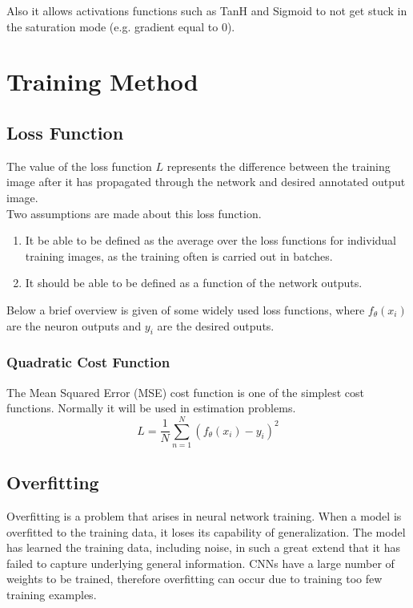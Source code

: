     Also it allows activations functions such as TanH and Sigmoid to not get stuck in the saturation mode (e.g. gradient equal to $0$).

    \section{Training Method}
    \label{training}
    \subsection{Loss Function}
    The value of the loss function $L$ represents the difference between the training image after it has propagated through the network and desired annotated output image.\\ 

    Two assumptions are made about this loss function. 
    \begin{enumerate}
        \item It be able to be defined as the average over the loss functions for individual training images, as the training often is carried out in batches.
        \item It should be able to be defined as a function of the network outputs. 
    \end{enumerate}

    Below a brief overview is given of some widely used loss functions, where $f_{\theta}(x_i)$ are the neuron outputs and $y_i$ are the desired outputs.
    \subsubsection{Quadratic Cost Function}
    The Mean Squared Error (MSE) cost function is one of the simplest cost functions. Normally it will be used in estimation problems\cite{boureau2008sparse}.
    \begin{equation}
        L =\frac{1}{N}\sum_{n=1}^{N}(f_{\theta}(x_i) - y_i)^2
        \label{eq:mse}
    \end{equation}


    \subsection{Overfitting}
    Overfitting is a problem that arises in neural network training. When a model is overfitted to the training data, it loses its capability of generalization. The model has learned the training data, including noise, in such a great extend that it has failed to capture underlying general information. CNNs have a large number of weights to be trained, therefore overfitting can occur due to training too few training examples. 


